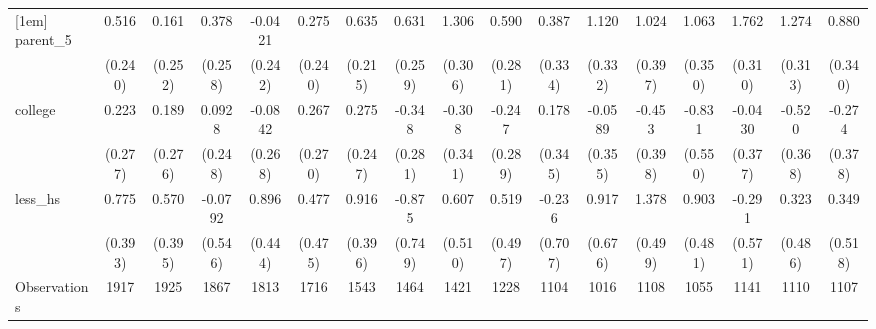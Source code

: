 {\begin{tabular}{l*{16}{c}}
[1em]
parent\_5            &       0.516\sym{*}  &       0.161         &       0.378         &     -0.0421         &       0.275         &       0.635\sym{**} &       0.631\sym{*}  &       1.306\sym{***}&       0.590\sym{*}  &       0.387         &       1.120\sym{***}&       1.024\sym{**} &       1.063\sym{**} &       1.762\sym{***}&       1.274\sym{***}&       0.880\sym{**} \\
                    &     (0.240)         &     (0.252)         &     (0.258)         &     (0.242)         &     (0.240)         &     (0.215)         &     (0.259)         &     (0.306)         &     (0.281)         &     (0.334)         &     (0.332)         &     (0.397)         &     (0.350)         &     (0.310)         &     (0.313)         &     (0.340)         \\
[1em]
college             &       0.223         &       0.189         &      0.0928         &     -0.0842         &       0.267         &       0.275         &      -0.348         &      -0.308         &      -0.247         &       0.178         &     -0.0589         &      -0.453         &      -0.831         &     -0.0430         &      -0.520         &      -0.274         \\
                    &     (0.277)         &     (0.276)         &     (0.248)         &     (0.268)         &     (0.270)         &     (0.247)         &     (0.281)         &     (0.341)         &     (0.289)         &     (0.345)         &     (0.355)         &     (0.398)         &     (0.550)         &     (0.377)         &     (0.368)         &     (0.378)         \\
[1em]
less\_hs             &       0.775\sym{*}  &       0.570         &     -0.0792         &       0.896\sym{*}  &       0.477         &       0.916\sym{*}  &      -0.875         &       0.607         &       0.519         &      -0.236         &       0.917         &       1.378\sym{**} &       0.903         &      -0.291         &       0.323         &       0.349         \\
                    &     (0.393)         &     (0.395)         &     (0.546)         &     (0.444)         &     (0.475)         &     (0.396)         &     (0.749)         &     (0.510)         &     (0.497)         &     (0.707)         &     (0.676)         &     (0.499)         &     (0.481)         &     (0.571)         &     (0.486)         &     (0.518)         \\
\hline
Observations        &        1917         &        1925         &        1867         &        1813         &        1716         &        1543         &        1464         &        1421         &        1228         &        1104         &        1016         &        1108         &        1055         &        1141         &        1110         &        1107         \\

\end{tabular}}
